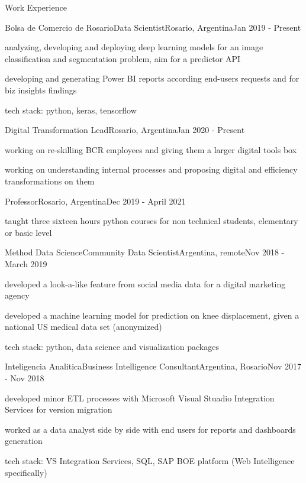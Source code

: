 \documentclass{article}
\newlength{\tabin}
\newlength{\secsep}
\newcommand{\lineunder}{\vspace*{-8pt} \\ \hspace*{-6pt} \hrulefill \\ \vspace*{-15pt}}
\newenvironment{tabbedsection}[1]{
  \begin{list}{}{
      \setlength{\itemsep}{0pt}
      \setlength{\labelsep}{0pt}
      \setlength{\labelwidth}{0pt}
      \setlength{\leftmargin}{\tabin}
      \setlength{\rightmargin}{\tabin}
      \setlength{\listparindent}{0pt}
      \setlength{\parsep}{0pt}
      \setlength{\parskip}{0pt}
      \setlength{\partopsep}{0pt}
      \setlength{\topsep}{#1}
    }
  \item[]
}{\end{list}}
\newenvironment{resume_section}[1]{
  \filbreak
  \vspace{2\secsep}
  \textsc{\large#1}
  \lineunder
  \begin{tabbedsection}{\secsep}
}{\end{tabbedsection}}
\newenvironment{subitems}{
  \renewcommand{\labelitemi}{-}
  \begin{itemize}
      \setlength{\labelsep}{1em}
}{\end{itemize}}
\newenvironment{resume_employer}[4]{
  \vspace{\secsep}
  \textbf{#1} \\ 
  \indent {\small #2} \hfill {\footnotesize#3 (#4)}
  \begin{tabbedsection}{0pt}
  \begin{subitems}
}{\end{subitems}\end{tabbedsection}}
\begin{document}
\begin{resume_section}{Work Experience}
  \begin{resume_employer}{Bolsa de Comercio de Rosario}{Data Scientist}{Rosario, Argentina}{Jan 2019 - Present}
    \item analyzing, developing and deploying deep learning models for an image classification and segmentation problem, aim for a predictor API 
    \item developing and generating Power BI reports according end-users requests and for biz insights findings
    \item tech stack: python, keras, tensorflow
  \end{resume_employer}
  
  \begin{resume_employer}{}{Digital Transformation Lead}{Rosario, Argentina}{Jan 2020 - Present}
    \item working on re-skilling BCR employees and giving them a larger digital tools box
    \item working on understanding internal processes and proposing digital and efficiency transformations on them
  \end{resume_employer}
  
  \begin{resume_employer}{}{Professor}{Rosario, Argentina}{Dec 2019 - April 2021}
    \item taught three sixteen hours python courses for non technical students, elementary or basic level
  \end{resume_employer}
  
  \begin{resume_employer}{Method Data Science}{Community Data Scientist}{Argentina, remote}{Nov 2018 - March 2019}
    \item developed a look-a-like feature from social media data for a digital marketing agency
    \item developed a machine learning model for prediction on knee displacement, given a national US medical data set (anonymized)
    \item tech stack: python, data science and visualization packages
  \end{resume_employer}
  
  \begin{resume_employer}{Inteligencia Analitica}{Business Intelligence Consultant}{Argentina, Rosario}{Nov 2017 - Nov 2018}
    \item developed minor ETL processes with Microsoft Visual Stuadio Integration Services for version migration
    \item worked as a data analyst side by side with end users for reports and dashboards generation
    \item tech stack: VS Integration Services, SQL, SAP BOE platform (Web Intelligence specifically)
  \end{resume_employer}
  

\end{resume_section}
\end{document}
